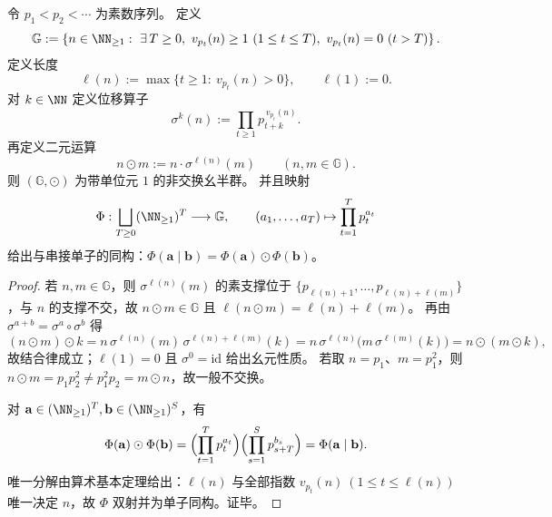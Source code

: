 \begin{proposition}\label{prop:conclusion-godel-prefix-prime-monoid}
令 \(p_1<p_2<\cdots\) 为素数序列。
定义
\[
\mathbb G:=
\left\{
n\in\NN_{\ge 1}:\ \exists\,T\ge 0,\ 
v_{p_t}(n)\ge 1\ (1\le t\le T),\
v_{p_t}(n)=0\ (t>T)
\right\}.
\]
定义长度
\[
\ell(n):=\max\{t\ge 1:\ v_{p_t}(n)>0\},
\qquad \ell(1):=0.
\]
对 \(k\in\NN\) 定义位移算子
\[
\sigma^k(n):=\prod_{t\ge 1}p_{t+k}^{\,v_{p_t}(n)}.
\]
再定义二元运算
\[
n\odot m:=n\cdot \sigma^{\ell(n)}(m)\qquad(n,m\in\mathbb G).
\]
则 \((\mathbb G,\odot)\) 为带单位元 \(1\) 的非交换幺半群。
并且映射
\[
\Phi:\bigsqcup_{T\ge 0}(\NN_{\ge 1})^T\longrightarrow \mathbb G,\qquad
(a_1,\dots,a_T)\mapsto \prod_{t=1}^{T}p_t^{a_t}
\]
给出与串接单子的同构：\(\Phi(\mathbf a\mid \mathbf b)=\Phi(\mathbf a)\odot\Phi(\mathbf b)\)。
\end{proposition}
\begin{proof}
若 \(n,m\in\mathbb G\)，则 \(\sigma^{\ell(n)}(m)\) 的素支撑位于
\(\{p_{\ell(n)+1},\dots,p_{\ell(n)+\ell(m)}\}\)，与 \(n\) 的支撑不交，故
\(
n\odot m\in\mathbb G
\)
且
\(
\ell(n\odot m)=\ell(n)+\ell(m)
\)。
再由
\(
\sigma^{a+b}=\sigma^a\circ\sigma^b
\)
得
\[
(n\odot m)\odot k
=n\,\sigma^{\ell(n)}(m)\,\sigma^{\ell(n)+\ell(m)}(k)
=n\,\sigma^{\ell(n)}\!\bigl(m\,\sigma^{\ell(m)}(k)\bigr)
=n\odot(m\odot k),
\]
故结合律成立；\(\ell(1)=0\) 且 \(\sigma^0=\mathrm{id}\) 给出幺元性质。
若取 \(n=p_1\)、\(m=p_1^2\)，则
\(
n\odot m=p_1p_2^2\neq p_1^2p_2=m\odot n
\)，故一般不交换。
\par
对 \(\mathbf a\in(\NN_{\ge 1})^T,\mathbf b\in(\NN_{\ge 1})^S\)，有
\[
\Phi(\mathbf a)\odot\Phi(\mathbf b)
=\Bigl(\prod_{t=1}^T p_t^{a_t}\Bigr)\Bigl(\prod_{s=1}^{S}p_{s+T}^{b_s}\Bigr)
=\Phi(\mathbf a\mid \mathbf b).
\]
唯一分解由算术基本定理给出：\(\ell(n)\) 与全部指数
\(
v_{p_t}(n)\ (1\le t\le \ell(n))
\)
唯一决定 \(n\)，故 \(\Phi\) 双射并为单子同构。证毕。
\end{proof}

